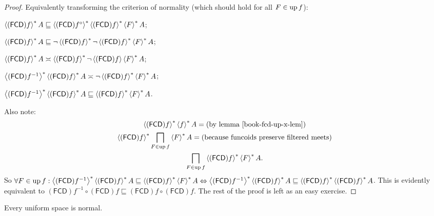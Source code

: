 \begin{proof}
  Equivalently transforming the criterion of normality (which should hold for
  all $F \in \operatorname{up} f$):
  
  $\left\langle (\mathsf{FCD}) f\right\rangle ^{\ast} A \sqsubseteq
  \left\langle (\mathsf{FCD}) f^{\circ}\right\rangle ^{\ast}
  \left\langle (\mathsf{FCD}) f\right\rangle ^{\ast} \left\langle F\right\rangle ^{\ast} A$;
  
  $\left\langle (\mathsf{FCD}) f\right\rangle ^{\ast} A \sqsubseteq \neg
  \left\langle (\mathsf{FCD}) f\right\rangle ^{\ast} \neg \left\langle  (\mathsf{FCD}) f \right\rangle ^{\ast}
  \left\langle F\right\rangle ^{\ast} A$;
  
  $\left\langle (\mathsf{FCD}) f\right\rangle ^{\ast} A \asymp
  \left\langle (\mathsf{FCD}) f\right\rangle ^{\ast} \neg \left\langle (\mathsf{FCD}) f\right\rangle \left\langle F\right\rangle ^{\ast} A$;
  
  $\left\langle (\mathsf{FCD}) f^{- 1}\right\rangle ^{\ast}
  \left\langle (\mathsf{FCD}) f\right\rangle ^{\ast} A \asymp \neg
  \left\langle (\mathsf{FCD}) f\right\rangle ^{\ast} \left\langle F\right\rangle ^{\ast} A$;
  
  $\left\langle (\mathsf{FCD}) f^{- 1}\right\rangle ^{\ast}
  \left\langle (\mathsf{FCD}) f\right\rangle ^{\ast} A \sqsubseteq
  \left\langle (\mathsf{FCD}) f\right\rangle ^{\ast} \left\langle F\right\rangle ^{\ast} A$.
  
  Also note:
  \begin{multline*}
     \rsupfun{(\mathsf{FCD}) f} \rsupfun{f} A = \text{(by lemma~\bookref{fcd-up-x-lem})} \\
     \rsupfun{(\mathsf{FCD}) f} \bigsqcap_{F \in \up f} \rsupfun{F} A = \text{(because funcoids preserve filtered meets)} \\
     \bigsqcap_{F \in \up f} \rsupfun{(\mathsf{FCD}) f} \rsupfun{F}
     A.
  \end{multline*}
  So $\forall F \in \operatorname{up} f : \left\langle  (\mathsf{FCD}) f^{- 1}
  \right\rangle ^{\ast} \left\langle (\mathsf{FCD}) f\right\rangle ^{\ast} A \sqsubseteq
  \left\langle (\mathsf{FCD}) f\right\rangle ^{\ast} \left\langle F\right\rangle ^{\ast} A
  \Leftrightarrow \left\langle (\mathsf{FCD}) f^{- 1}\right\rangle ^{\ast}
  \left\langle (\mathsf{FCD}) f\right\rangle ^{\ast} A \sqsubseteq
  \left\langle (\mathsf{FCD}) f\right\rangle ^{\ast} \left\langle (\mathsf{FCD}) f\right\rangle ^{\ast} A$. This is
  evidently equivalent to $(\mathsf{FCD}) f^{- 1} \circ
  (\mathsf{FCD}) f \sqsubseteq (\mathsf{FCD}) f \circ
  (\mathsf{FCD}) f$. The rest of the proof is left as an easy exercise.
\end{proof}

\begin{cor}
  Every uniform space is normal.
\end{cor}
